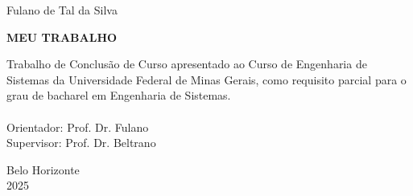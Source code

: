 \newpage
\begin{center}
\vspace{4cm}

Fulano de Tal da Silva

\vspace{4cm}  

{ \uppercase{ \textbf{Meu trabalho} } }
\end{center}

\vspace{2cm}

\begin{adjustwidth}{4cm}{0cm}
    Trabalho de Conclusão de Curso apresentado ao Curso de Engenharia de Sistemas da Universidade Federal de Minas Gerais, 
    como requisito parcial para o grau de bacharel em Engenharia de Sistemas. \\
    \\
    Orientador: Prof. Dr. Fulano  \\
    Supervisor: Prof. Dr. Beltrano
\end{adjustwidth}

\vfill

\begin{center}
Belo Horizonte \\
2025
\end{center}
\thispagestyle{empty}